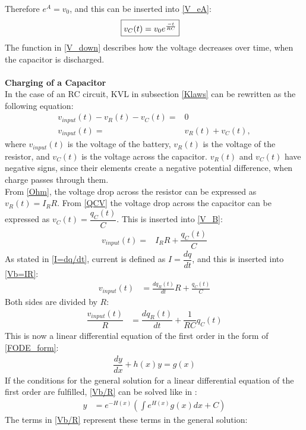 Therefore $e^A = v_0$, and this can be inserted into \eqref{V_eA}:
\begin{align}
\label{V_down}
\Aboxed{
 v_C(t) = v_0e^{\frac{-t}{RC}}
 }
\end{align}
The function in \eqref{V_down} describes how the voltage decreases over time, when the capacitor is discharged.
\\
\\
\textbf{Charging of a Capacitor}\\
In the case of an RC circuit, KVL in subsection \ref{Klaws} can be rewritten as the following equation:
\begin{align}
v_{input}(t)-v_R(t)-v_C(t) =& 0 \nonumber \\
v_{input}(t) =& v_R(t)+v_C(t), \label{V_B}
\end{align}
where $v_{input}(t)$ is the voltage of the battery, $v_R(t)$ is the voltage of the resistor, and $v_C(t)$ is the voltage across the capacitor. $v_R(t)$ and $v_C(t)$ have negative signs, since their elements create a negative potential difference, when charge passes through them.
\\
From \eqref{Ohm}, the voltage drop across the resistor can be expressed as $v_R(t)=I_R R$. From \eqref{QCV} the voltage drop across the capacitor can be expressed as $v_C(t)=\dfrac{q_C (t)}{C}$. This is inserted into \eqref{V_B}:
\begin{align}
v_{input}(t) =& I_R R + \dfrac{q_C (t)}{C} \label{Vb=IR}
\end{align}
As stated in \eqref{I=dq/dt}, current is defined as $I =\dfrac{dq}{dt}$, and this is inserted into \eqref{Vb=IR}:
 \begin{align*}
 	v_{input}(t) &= \frac{dq_R(t)}{dt} R + \frac{q_C (t)}{C}
 \end{align*}
Both sides are divided by $R$:
\begin{align}
\dfrac{v_{input}(t)}{R} &= \dfrac{dq_R(t)}{dt} + \dfrac{1}{RC}q_C(t)\label{Vb/R} 
\end{align}
This is now a linear differential equation of the first order in the form of \eqref{FODE_form}:
\begin{align*}
\dfrac{dy}{dx}+h(x)y=g(x)
\end{align*}
If the conditions for the general solution for a linear differential equation of the first order are fulfilled, \eqref{Vb/R} can be solved like in :
\begin{align*}
y&=e^{-H(x)}\left(\int e^{H(x)}g(x)dx+C\right)
\end{align*}
The terms in \eqref{Vb/R} represent these terms in the general solution:


